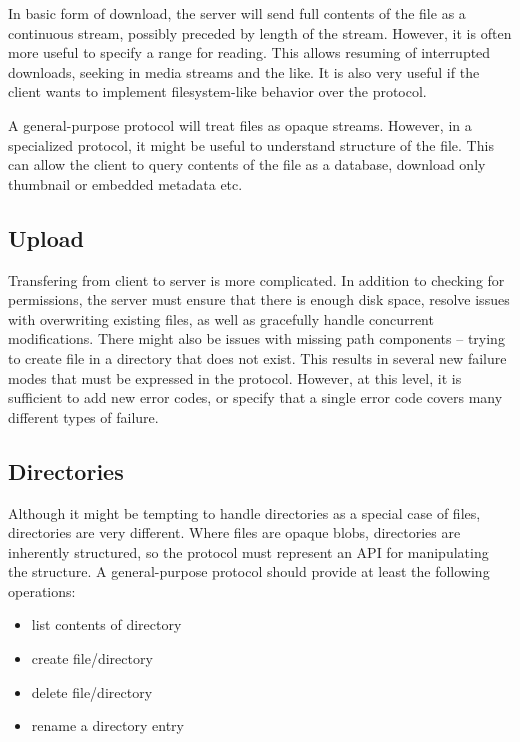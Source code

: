 In basic form of download, the server will send full contents of the file as a continuous stream, possibly
preceded by length of the stream. However, it is often more useful to specify a range for reading. This allows
resuming of interrupted downloads, seeking in media streams and the like. It is also very useful if the client
wants to implement filesystem-like behavior over the protocol.

A general-purpose protocol will treat files as opaque streams. However, in a specialized protocol, it might be
useful to understand structure of the file. This can allow the client to query contents of the file as
a database, download only thumbnail or embedded metadata etc.

\subsection{Upload}

Transfering from client to server is more complicated. In addition to checking for permissions, the server
must ensure that there is enough disk space, resolve issues with overwriting existing files, as well as
gracefully handle concurrent modifications. There might also be issues with missing path components -- trying
to create file in a directory that does not exist. This results in several new failure modes that must be
expressed in the protocol. However, at this level, it is sufficient to add new error codes, or specify that
a single error code covers many different types of failure.

\subsection{Directories}

Although it might be tempting to handle directories as a special case of files, directories are very
different. Where files are opaque blobs, directories are inherently structured, so the protocol must represent
an API for manipulating the structure. A general-purpose protocol should provide at least the following
operations:

\begin{itemize}
	\item list contents of directory
	\item create file/directory
	\item delete file/directory
	\item rename a directory entry
\end{itemize}

